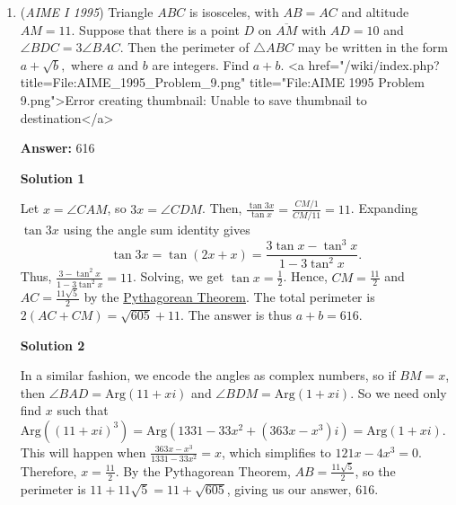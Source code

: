 \begin{enumerate}
 For $y=5$, we have $35,65,95$, or $3$ cases. 

 For $y=6$, we have $48,90$, or $2$ cases. 

 For $y=7$, we have $63$, or $1$ case. 

 For $y=8$, we have $80$, or $1$ case. 

 For $y=9$, we have $99$, or $1$ case. 

 Adding, we get our final result of $\boxed{085}.$

 Note: In general, all of the solutions for all $y$ are $y+by(y+1)$, for any $b$ such that $y+by(y+1)=x<100$

 Also, note that $n+1$ just starts with $(y+1)^2$, and adds $y(y+1)$ until it is greater than $100$.

 


	\item (\textit{AIME I 1995}) Triangle $ABC$ is isosceles, with $AB=AC$ and altitude $AM=11.$  Suppose that there is a point $D$ on $\overline{AM}$ with $AD=10$ and $\angle BDC=3\angle BAC.$  Then the perimeter of $\triangle ABC$ may be written in the form $a+\sqrt{b},$ where $a$ and $b$ are integers.  Find $a+b.$
<a href="/wiki/index.php?title=File:AIME\_1995\_Problem\_9.png" title="File:AIME 1995 Problem 9.png">Error creating thumbnail: Unable to save thumbnail to destination</a>

 \textbf{Answer: }616



\textbf{Solution 1}

Let $x=\angle CAM$, so $3x=\angle CDM$. Then, $\frac{\tan 3x}{\tan x}=\frac{CM/1}{CM/11}=11$. Expanding $\tan 3x$ using the angle sum identity gives 
 \[\tan 3x=\tan(2x+x)=\frac{3\tan x-\tan^3x}{1-3\tan^2x}.\] Thus, $\frac{3-\tan^2x}{1-3\tan^2x}=11$. Solving, we get $\tan x= \frac 12$. Hence, $CM=\frac{11}2$ and $AC= \frac{11\sqrt{5}}2$ by the \href{https://artofproblemsolving.com/wiki/index.php?title=Pythagorean\_Theorem}{Pythagorean Theorem}. The total perimeter is $2(AC + CM) = \sqrt{605}+11$. The answer is thus $a+b=\boxed{616}$.

 



\textbf{Solution 2}

In a similar fashion, we encode the angles as complex numbers, so if $BM=x$, then $\angle BAD=\text{Arg}(11+xi)$ and $\angle BDM=\text{Arg}(1+xi)$. So we need only find $x$ such that $\text{Arg}((11+xi)^3)=\text{Arg}(1331-33x^2+(363x-x^3)i)=\text{Arg}(1+xi)$. This will happen when $\frac{363x-x^3}{1331-33x^2}=x$,  which simplifies to $121x-4x^3=0$. Therefore, $x=\frac{11}{2}$. By the Pythagorean Theorem, $AB=\frac{11\sqrt{5}}{2}$, so the perimeter is $11+11\sqrt{5}=11+\sqrt{605}$, giving us our answer, $\boxed{616}$.


\end{enumerate}

